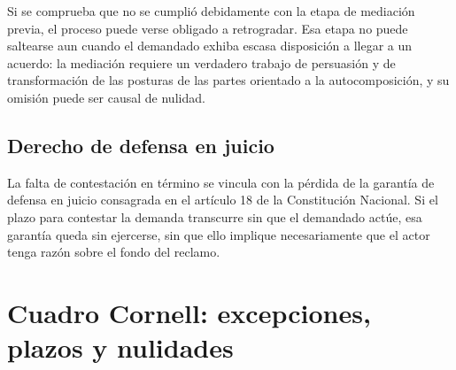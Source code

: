\documentclass[12pt,oneside]{book}
\begin{document}
Si se comprueba que no se cumplió debidamente con la etapa de mediación previa, el proceso puede verse obligado a retrogradar. Esa etapa no puede saltearse aun cuando el demandado exhiba escasa disposición a llegar a un acuerdo: la mediación requiere un verdadero trabajo de persuasión y de transformación de las posturas de las partes orientado a la autocomposición, y su omisión puede ser causal de nulidad.

\subsection{Derecho de defensa en juicio}

La falta de contestación en término se vincula con la pérdida de la garantía de defensa en juicio consagrada en el artículo 18 de la Constitución Nacional. Si el plazo para contestar la demanda transcurre sin que el demandado actúe, esa garantía queda sin ejercerse, sin que ello implique necesariamente que el actor tenga razón sobre el fondo del reclamo.

\section*{Cuadro Cornell: excepciones, plazos y nulidades}
\end{document}
